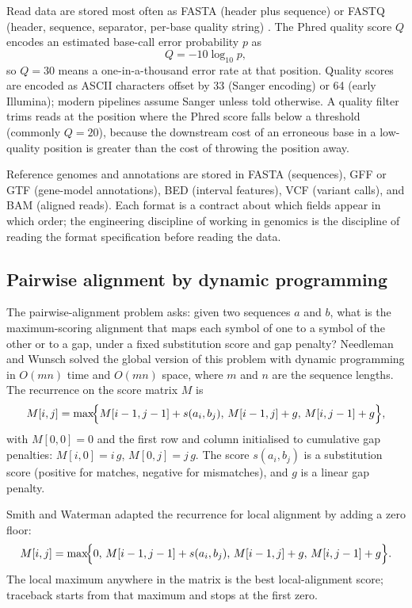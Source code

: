 Read data are stored most often as FASTA (header plus sequence) or
FASTQ (header, sequence, separator, per-base quality string)
\cite{paper:v6c11-cock-fasta-2010}. The Phred quality score $Q$ encodes
an estimated base-call error probability $p$ as
\[
Q = -10 \log_{10} p,
\]
so $Q = 30$ means a one-in-a-thousand error rate at that position.
Quality scores are encoded as ASCII characters offset by 33 (Sanger
encoding) or 64 (early Illumina); modern pipelines assume Sanger
unless told otherwise. A quality filter trims reads at the position
where the Phred score falls below a threshold (commonly $Q=20$),
because the downstream cost of an erroneous base in a low-quality
position is greater than the cost of throwing the position away.

Reference genomes and annotations are stored in FASTA (sequences),
GFF or GTF (gene-model annotations), BED (interval features), VCF
(variant calls), and BAM (aligned reads). Each format is a contract
about which fields appear in which order; the engineering discipline
of working in genomics is the discipline of reading the format
specification before reading the data.

\subsection{Pairwise alignment by dynamic programming}

The pairwise-alignment problem asks: given two sequences $a$ and $b$,
what is the maximum-scoring alignment that maps each symbol of one to
a symbol of the other or to a gap, under a fixed substitution score
and gap penalty? Needleman and Wunsch \cite{paper:v6c11-needleman-wunsch-1970}
solved the global version of this problem with dynamic programming in
$O(mn)$ time and $O(mn)$ space, where $m$ and $n$ are the sequence lengths.
The recurrence on the score matrix $M$ is
\[
M[i,j] = \max\!\Bigl\{ M[i-1,j-1] + s(a_i, b_j),\, M[i-1,j] + g,\, M[i,j-1] + g \Bigr\},
\]
with $M[0,0] = 0$ and the first row and column initialised to cumulative
gap penalties: $M[i,0] = i\,g$, $M[0,j] = j\,g$. The score $s(a_i, b_j)$
is a substitution score (positive for matches, negative for mismatches),
and $g$ is a linear gap penalty.

Smith and Waterman \cite{paper:v6c11-smith-waterman-1981} adapted the
recurrence for local alignment by adding a zero floor:
\[
M[i,j] = \max\!\Bigl\{ 0,\, M[i-1,j-1] + s(a_i, b_j),\, M[i-1,j] + g,\, M[i,j-1] + g \Bigr\}.
\]
The local maximum anywhere in the matrix is the best local-alignment
score; traceback starts from that maximum and stops at the first zero.

